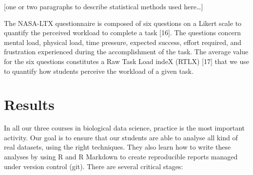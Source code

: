 \documentclass[
]{article}
\begin{document}
{[}one or two paragraphs to describe statistical methods used
here\ldots{]}

The NASA-LTX questionnaire is composed of six questions on a Likert
scale to quantify the perceived workload to complete a task {[}16{]}.
The questions concern mental load, physical load, time pressure,
expected success, effort required, and frustration experienced during
the accomplishment of the task. The average value for the six questions
constitutes a Raw Task Load indeX (RTLX) {[}17{]} that we use to
quantify how students perceive the workload of a given task.

\hypertarget{results}{%
\section{Results}\label{results}}

In all our three courses in biological data science, practice is the
most important activity. Our goal is to ensure that our students are
able to analyse all kind of real datasets, using the right techniques.
They also learn how to write these analyses by using R and R Markdown to
create reproducible reports managed under version control (git). There
are several critical stages:
\end{document}
